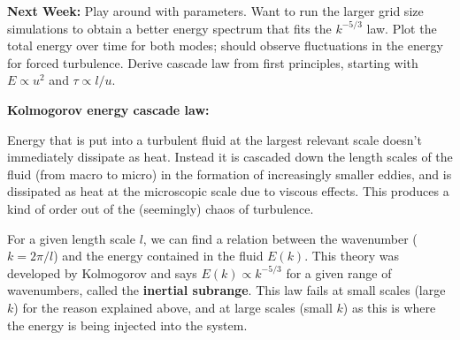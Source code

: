 \documentclass[12pt,letterpaper]{article}
\begin{document}
\textbf{Next Week:} Play around with parameters. Want to run the larger grid size simulations to obtain a better energy spectrum that fits the $k^{-5/3}$ law. Plot the total energy over time for both modes; should observe fluctuations in the energy for forced turbulence. Derive cascade law from first principles, starting with $E\propto u^2$ and $\tau \propto l/u$.

\hypertarget{Kolmogorov}{\textbf{Kolmogorov energy cascade law:}} Energy that is put into a turbulent fluid at the largest relevant scale doesn't immediately dissipate as heat. Instead it is cascaded down the length scales of the fluid (from macro to micro) in the formation of increasingly smaller eddies, and is dissipated as heat at the microscopic scale due to viscous effects. This produces a kind of order out of the (seemingly) chaos of turbulence.

For a given length scale $l$, we can find a relation between the wavenumber ($k=2\pi/l$) and the energy contained in the fluid $E(k)$. This theory was developed by Kolmogorov and says $E(k)\propto k^{-5/3}$ for a given range of wavenumbers, called the \textbf{inertial subrange}. This law fails at small scales (large $k$) for the reason explained above, and at large scales (small $k$) as this is where the energy is being injected into the system.
\end{document}

